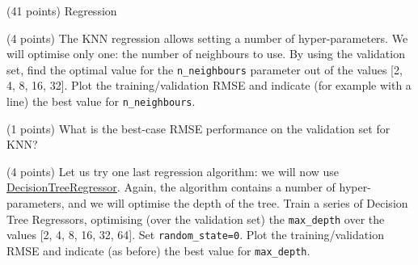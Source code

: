 \documentclass[12pt]{article}
\begin{document}
\begin{question}{\label{Q_LR_BA}(41 points) Regression}
\begin{subquestion}



\end{subquestion}

\begin{subquestion}{(4 points) The KNN regression allows setting a number of hyper-parameters. We will optimise only one: the number of neighbours to use. By using the validation set, find the optimal value for the \texttt{n\_neighbours} parameter out of the values [2, 4, 8, 16, 32]. Plot the training/validation RMSE and indicate (for example with a line) the best value for \texttt{n\_neighbours}.}






\end{subquestion}

\begin{subquestion}{(1 points) What is the best-case RMSE performance on the validation set for KNN?}






\end{subquestion}

\begin{subquestion}{(4 points) Let us try one last regression algorithm: we will now use \href{https://scikit-learn.org/stable/modules/generated/sklearn.tree.DecisionTreeRegressor.html}{DecisionTreeRegressor}. Again, the algorithm contains a number of hyper-parameters, and we will optimise the depth of the tree. Train a series of Decision Tree Regressors, optimising (over the validation set) the \texttt{max\_depth} over the values [2, 4, 8, 16, 32, 64]. Set \texttt{random\_state=0}. Plot the training/validation RMSE and indicate (as before) the best value for \texttt{max\_depth}.}




\end{subquestion}
\end{question}
\end{document}
